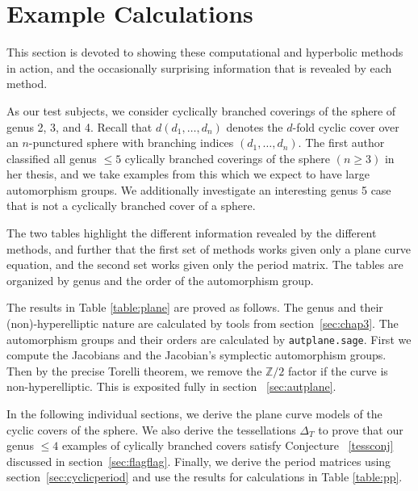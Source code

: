 \documentclass[12pt,reqno]{amsart}
\newcommand{\Z}{\mathbb{Z}}
\theoremstyle{definition}
\theoremstyle{remark}
\begin{document}
\section{Example Calculations}
\label{sec:examples}
This section is devoted to showing these computational and hyperbolic methods in action, and the occasionally surprising information that is revealed by each method. 

As our test subjects, we consider cyclically branched coverings of the sphere of genus 2, 3, and 4. Recall that $d (d_1, \ldots , d_n)$ denotes the $d$-fold cyclic cover over an $n$-punctured sphere with branching indices $(d_1, \ldots , d_n).$ The first author classified all genus $\leq 5$ cylically branched coverings of the sphere $(n \geq 3)$ in her thesis, and we take examples from this which we expect to have large automorphism groups. We additionally investigate an interesting genus 5 case that is not a cyclically branched cover of a sphere.

The two tables highlight the different information revealed by the different methods, and further that the first set of methods works given only a plane curve equation, and the second set works given only the period matrix. The tables are organized by genus and the order of the automorphism group. 





The results in Table \ref{table:plane} are proved as follows. The genus and their (non)-hyperelliptic nature are calculated by tools from section~\ref{sec:chap3}. The automorphism groups and their orders are calculated by \texttt{autplane.sage}. First we compute the Jacobians and the Jacobian's symplectic automorphism groups. Then by the precise Torelli theorem, we remove the $\Z/2$ factor if the curve is non-hyperelliptic. This is exposited fully in section ~\ref{sec:autplane}. 

In the following individual sections, we derive the plane curve models of the cyclic covers of the sphere. We also derive the tessellations $\Delta_T$ to prove that our genus $\leq 4$ examples of cylically branched covers satisfy Conjecture ~\ref{tessconj} discussed in section~\ref{sec:flagflag}. Finally, we derive the period matrices using section~\ref{sec:cyclicperiod} and use the results for calculations in Table \ref{table:pp}. 
\end{document}
